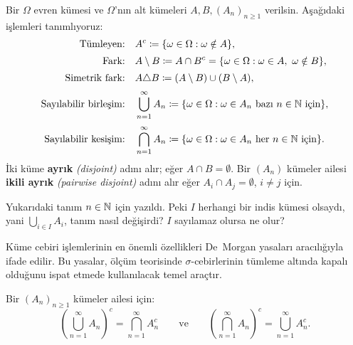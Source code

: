 \begin{tanim}\label{def:kumecebiri}
Bir $\Omega$ evren kümesi ve $\Omega$'nın alt kümeleri $A, B, (A_n)_{n \geq 1}$
verilsin. Aşağıdaki işlemleri tanımlıyoruz:
\begin{align*}
  \text{Tümleyen:}\quad
    & A^c \coloneqq \{\omega \in \Omega : \omega \notin A\}, \\[2pt]
  \text{Fark:}\quad
    & A \setminus B \coloneqq A \cap B^c
      = \{\omega \in \Omega : \omega \in A,\ \omega \notin B\}, \\[2pt]
  \text{Simetrik fark:}\quad
    & A \triangle B \coloneqq (A \setminus B) \cup (B \setminus A), \\[2pt]
  \text{Sayılabilir birleşim:}\quad
    & \bigcup_{n=1}^\infty A_n
      \coloneqq \{\omega \in \Omega : \omega \in A_n \text{ bazı } n \in \mathbb{N} \text{ için}\}, \\[2pt]
  \text{Sayılabilir kesişim:}\quad
    & \bigcap_{n=1}^\infty A_n
      \coloneqq \{\omega \in \Omega : \omega \in A_n \text{ her } n \in \mathbb{N} \text{ için}\}.
\end{align*}
İki küme \textbf{ayrık} \emph{(disjoint)} adını alır; eğer $A \cap B = \emptyset$.
Bir $(A_n)$ kümeler ailesi \textbf{ikili ayrık} \emph{(pairwise disjoint)} adını alır
eğer $A_i \cap A_j = \emptyset$, $i \neq j$ için.
\end{tanim}

\begin{kritiksorgu}
Yukarıdaki tanım $n \in \mathbb{N}$ için yazıldı. Peki $I$ herhangi bir indis
kümesi olsaydı, yani $\bigcup_{i \in I} A_i$, tanım nasıl değişirdi? $I$
sayılamaz olursa ne olur?
\end{kritiksorgu}

Küme cebiri işlemlerinin en önemli özellikleri De~Morgan yasaları aracılığıyla
ifade edilir. Bu yasalar, ölçüm teorisinde $\sigma$-cebirlerinin tümleme altında
kapalı olduğunu ispat etmede kullanılacak temel araçtır.

\begin{teorem}\label{thm:demorgan}
Bir $(A_n)_{n \geq 1}$ kümeler ailesi için:
\[
  \left(\bigcup_{n=1}^\infty A_n\right)^c = \bigcap_{n=1}^\infty A_n^c
  \qquad \text{ve} \qquad
  \left(\bigcap_{n=1}^\infty A_n\right)^c = \bigcup_{n=1}^\infty A_n^c.
\]
\end{teorem}

